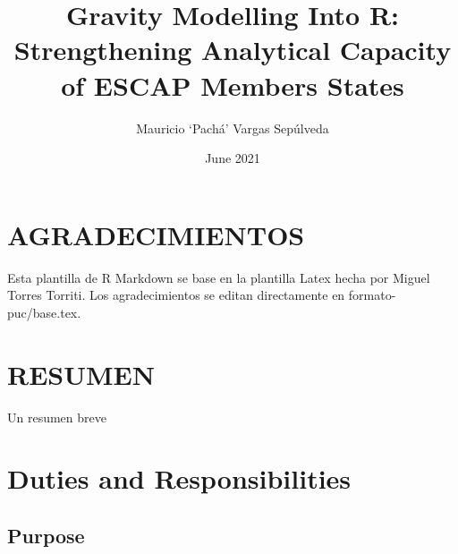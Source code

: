 \documentclass[12pt,reqno,oneside,pdftex]{formato-puc/puctesis} %
\begin{document}
\title{Gravity Modelling Into R: Strengthening Analytical Capacity of
ESCAP Members States}
\author{Mauricio `Pachá' Vargas Sepúlveda}

\date         {June 2021}
\dedication   {To my family, friends, and all the valuable people from
PUC.}

\PageNumbersFootCentered
{}
\maketitle

\chapter*{AGRADECIMIENTOS}
Esta plantilla de R Markdown se base en la plantilla Latex hecha por
Miguel Torres Torriti. Los agradecimientos se editan directamente en formato-puc/base.tex.
\par

\cleardoublepage
\tableofcontents
\listoffigures          
\listoftables           
\cleardoublepage

\chapter*{RESUMEN}
Un resumen breve

\cleardoublepage %

\NoChapterPageNumber           %

\chapter{Duties and Responsibilities}

\hypertarget{purpose}{%
\section{Purpose}\label{purpose}}
\end{document}
